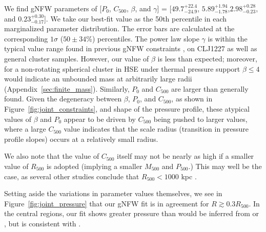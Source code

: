 \documentclass[onecolumn,traditabstract]{aa}
\begin{document}
We find gNFW parameters of [$P_0$, $C_{500}$, $\beta$, and $\gamma$] =
[$49.7_{-24.9}^{+22.4}$, $5.89_{-1.78}^{+1.94}$,$2.98_{-0.23}^{+0.28}$, and $0.23_{-0.17}^{+0.30}$].
We take our best-fit value as the 50th percentile in each marginalized parameter distribution.
The error bars are calculated at the corresponding $1\sigma$ ($50 \pm 34$\%) percentiles.
The power law slope $\gamma$ is within the typical value range found in previous gNFW constraints
\citep[e.g.,]{nagai2007,arnaud2010,sayers2013},
on CLJ1227 as well as general cluster samples. However, our value of $\beta$ is less than expected;
moreover, for a non-rotating spherical cluster in HSE under thermal pressure support $\beta \le 4$ would
indicate an unbounded mass at arbitrarily large radii (Appendix~\ref{sec:finite_mass}).
Similarly, $P_0$ and $C_{500}$ are larger than generally found.
Given the degeneracy between $\beta$, $P_0$, and $C_{500}$, as shown in Figure~\ref{fig:joint_constraints},
and shape of the pressure profile, these atypical
values of $\beta$ and  $P_0$ appear to be driven by $C_{500}$ being pushed to larger values, where a large $C_{500}$
value indicates that the scale radius (transition in pressure profile slopes) occurs at a relatively small radius.

We also note that the value of $C_{500}$ itself may not be nearly as high if a smaller value of $R_{500}$
is adopted (implying a smaller $M_{500}$ and $P_{500}$.) This may well be the case, as several other
studies conclude that $R_{500} < 1000$ kpc \citep[e.g.,][]{rumsey2016,mroczkowski2009}.

Setting aside the variations in parameter values themselves, we see in Figure~\ref{fig:joint_pressure} that our
gNFW fit is in agreement for $R \gtrsim 0.3 R_{500}$. In the central regions, our fit shows greater pressure than
would be inferred from  or \citet{planck2013a}, but is consistent with \citet{romero2017}.
\end{document}
